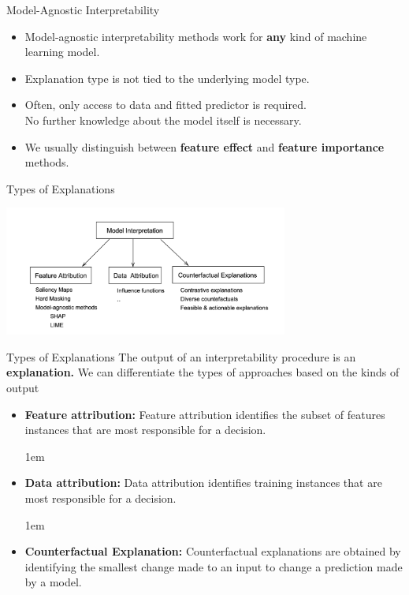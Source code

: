 \documentclass[aspectratio=169]{../latex_main/tntbeamer}  %
\begin{document}
\begin{frame}[c]{Model-Agnostic Interpretability}
	\begin{itemize}
		\itemsep2em
		\item Model-agnostic interpretability methods work for \textbf{any} kind of machine learning model.
		\item Explanation type is not tied to the underlying model type.
		\item Often, only access to data and fitted predictor is required.\\
		 No further knowledge about the model itself is necessary.
		\item We usually distinguish between \textbf{feature effect} and \textbf{feature importance} methods.
	\end{itemize}
\end{frame}


\begin{frame}[c]{Types of Explanations}
	\begin{center}
		\includegraphics[width=0.7\textwidth]{./figure/1-attributions.png}
    \end{center}
\end{frame}



\begin{frame}[c]{Types of Explanations}
	\vspace{-2em}
	The output of an interpretability procedure is an \textbf{explanation.} We can differentiate the types of approaches based on the kinds of output

	
	\begin{itemize}

    \itemsep1em
	\item 
		\textbf{Feature attribution:} Feature attribution identifies the subset of features instances that are most responsible for a decision.
	
	\itemsep1em
	
	\pause
	\item 
		\textbf{Data attribution:} Data attribution identifies  training instances that are most responsible for a decision.
		
		\itemsep1em
		
	\pause
	\item 
	   \textbf{Counterfactual Explanation:} 
	   Counterfactual explanations are  obtained by identifying the smallest change made to an input to change a prediction made by a model.
	  
	\end{itemize}
	
\end{frame}
\end{document}
